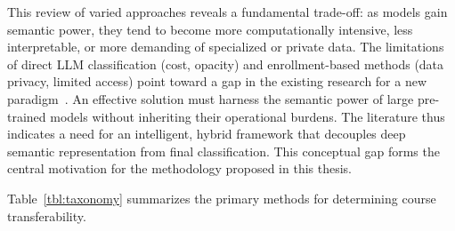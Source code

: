 This review of varied approaches reveals a fundamental trade-off: as models gain semantic power, they tend to become more computationally intensive, less interpretable, or more demanding of specialized or private data. The limitations of direct LLM classification (cost, opacity) and enrollment-based methods (data privacy, limited access) point toward a gap in the existing research for a new paradigm~\cite{pardos-articulation-2019, slade10.1177/0002764213479366}. An effective solution must harness the semantic power of large pre-trained models without inheriting their operational burdens. The literature thus indicates a need for an intelligent, hybrid framework that decouples deep semantic representation from final classification. This conceptual gap forms the central motivation for the methodology proposed in this thesis.

Table~\ref{tbl:taxonomy} summarizes the primary methods for determining course transferability.

